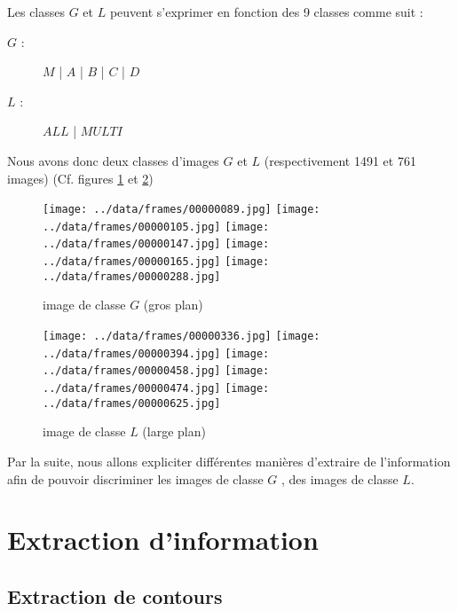 \documentclass{book}
\begin{document}
Les classes $G$ et $L$ peuvent s'exprimer en fonction des 9 classes comme suit :\\

\begin{description} %
\item[$G$ :] $M$ | $A$ | $B$ | $C$ | $D$
\item[$L$ :] $ALL$ | $MULTI$\\
\end{description}


Nous avons donc deux classes d'images $G$ et $L$ (respectivement 1491 et 761 images) (Cf. figures \ref{classeG} et
\ref{classeL}) \\

\begin{figure}[H]
\begin{center}
\texttt{[image: ../data/frames/00000089.jpg]}
\texttt{[image: ../data/frames/00000105.jpg]}
\texttt{[image: ../data/frames/00000147.jpg]}
\texttt{[image: ../data/frames/00000165.jpg]}
\texttt{[image: ../data/frames/00000288.jpg]}
\end{center}
\caption{image de classe $G$ (gros plan)}
\label{classeG}
\end{figure}

\begin{figure}[H]
\begin{center}
\texttt{[image: ../data/frames/00000336.jpg]}
\texttt{[image: ../data/frames/00000394.jpg]}
\texttt{[image: ../data/frames/00000458.jpg]}
\texttt{[image: ../data/frames/00000474.jpg]}
\texttt{[image: ../data/frames/00000625.jpg]}
\end{center}
\caption{image de classe $L$ (large plan)}
\label{classeL}
\end{figure}

Par la suite, nous allons expliciter différentes manières d'extraire de l'information afin de pouvoir discriminer les images de classe $G$
, des images de classe $L$.

\chapter{Extraction d'information}
\section{Extraction de contours}
\end{document}
